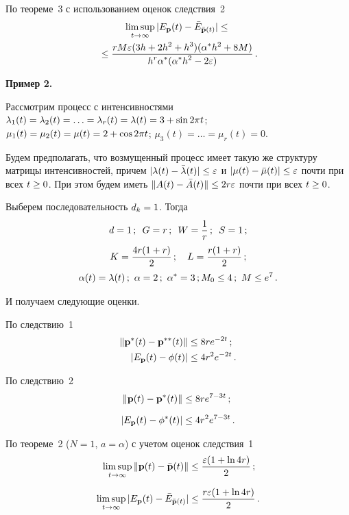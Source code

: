\begin{multicols}{2}
По теореме~3 с использованием оценок следствия~2
\begin{multline*}
\limsup\limits_{t \to \infty}   |E_{\bf p}(t)- \bar{E}_{\bar{\bf p}(t)}| \le {}\\
{}\le
\displaystyle\frac{\displaystyle rM\varepsilon(3h+2h^2+h^3)(\alpha^* h^2+8M)\mathstrut}{\displaystyle h^r\alpha^*(\alpha^* h^2-2\varepsilon)\mathstrut}\,.
\end{multline*}

\noindent

\textbf{Пример 2.}

Рассмотрим процесс с интенсивностями 
$\la_1(t)\hm=\la_2(t)\hm=\ldots=\la_r(t) \hm= \la(t) \hm= 3\hm+\sin{2\pi t}$; 
$\mu_1(t)\hm=\mu_2(t)\hm= \mu(t) \hm= 2+\cos{2\pi t}$;
$\mu_3(t)=\ldots=\mu_r(t)=0$.

Будем предполагать, что возмущенный процесс имеет такую же структуру 
мат\-ри\-цы интен\-сив\-ностей, причем $|\la(t)-\bar{\la}(t)| \hm\le \varepsilon$ и  
$|\mu(t)-\bar{\mu}(t)| \hm\le \varepsilon$ почти при всех $t \hm\ge 0$. 
При этом будем иметь $\| A(t)\hm-\bar{A}(t)\| \hm\le 2r \varepsilon$ почти при всех $t \hm\ge 0$.

Выберем последовательность $d_k\hm=1$. Тогда  
\begin{gather*}
d=1\,; \enskip G=r\,; \enskip W=\displaystyle\frac{\displaystyle 1\mathstrut}{\displaystyle r\mathstrut}\,; \enskip S=1\,; \\
K=\displaystyle\frac{\displaystyle 4r(1+r)\mathstrut}{\displaystyle 2\mathstrut}\,; \quad L=\displaystyle\frac{\displaystyle r(1+r)\mathstrut}{\displaystyle 2\mathstrut}\,;
\\
\alpha(t)=\lambda(t)\,; \ \alpha=2\,; \ \alpha^*=3\,; M_0 \le 4\,; \ M \le  e^{7}\,.
\end{gather*}

И получаем следующие оценки.

\columnbreak

По следствию~1
\begin{align*}
 \|{\bf p^*}(t)- {\bf p^{**}}(t)\| &\le 8re^{-2t}\,;\\
|E_{\bf p}(t)- \phi(t)|&\le  4r^2 e^{-2t}\,.
\end{align*}

По следствию~2
\begin{align*}
\|{\bf p}(t)- {\bf p^{*}}(t)\| &\le 8re^{7-3t}\,;
\\[6pt]
|E_{\bf p}(t)- \phi^*(t)| &\le 4r^2 e^{7-3t}\,.
\end{align*}

По теореме~2 ($N=1$, $a=\alpha$) с учетом оценок следствия~1
\begin{align*}
\limsup\limits_{t \to \infty} \|{\bf p}(t)- \bar{\bf p}(t)\| &\le 
\displaystyle\frac{\displaystyle \varepsilon(1+\ln{4r})\mathstrut}{\displaystyle 2\mathstrut}\,;
\\[6pt]
\limsup\limits_{t \to \infty}   |E_{\bf p}(t)- \bar{E}_{\bar{\bf p}(t)}|
&\le \displaystyle\frac{\displaystyle r\varepsilon(1+\ln{4r})\mathstrut}{\displaystyle 2\mathstrut}\,.
\end{align*}


\end{multicols}
